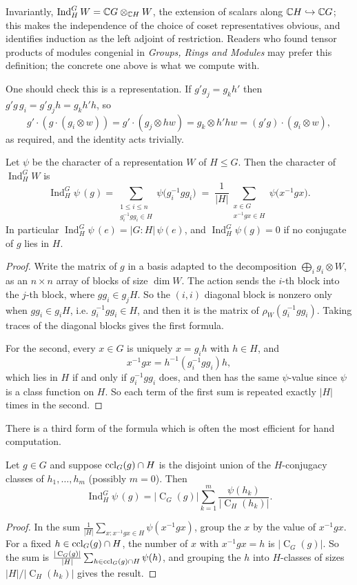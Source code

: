 \documentclass[a4paper]{scrartcl}
\newcommand{\Ind}{\operatorname{Ind}}
\newcommand{\Cent}{\operatorname{C}}
\begin{document}
\begin{remark}
	Invariantly, $\Ind_H^GW = \C G\otimes_{\C H}W$, the extension of scalars along $\mathbb{C} H\hookrightarrow\mathbb{C} G$; this makes the independence of the choice of coset representatives obvious, and identifies induction as the left adjoint of restriction. Readers who found tensor products of modules congenial in \emph{Groups, Rings and Modules} may prefer this definition; the concrete one above is what we compute with.
\end{remark}

One should check this is a representation. If $g' g_j = g_k h'$ then $g'g\,g_i = g'g_jh = g_kh'h$, so
$$g'\cdot(g\cdot(g_i\otimes w)) = g'\cdot (g_j\otimes hw) = g_k\otimes h'hw = (g'g)\cdot(g_i\otimes w),$$
as required, and the identity acts trivially.

\begin{theorem}
	Let $\psi$ be the character of a representation $W$ of $H\leq G$. Then the character of $\Ind_H^GW$ is
	$$\Ind_H^G\psi\,(g) = \sum_{\substack{1\leq i\leq n \\ g_i^{-1}gg_i\in H}}\psi\big(g_i^{-1}gg_i\big) \; = \; \frac1{|H|}\sum_{\substack{x\in G\\ x^{-1}gx\in H}}\psi\big(x^{-1}gx\big).$$
	In particular $\Ind_H^G\psi\,(e) = |G:H|\,\psi(e)$, and $\Ind_H^G\psi(g) = 0$ if no conjugate of $g$ lies in $H$.
\end{theorem}
\begin{proof}
	Write the matrix of $g$ in a basis adapted to the decomposition $\bigoplus_i g_i\otimes W$, as an $n\times n$ array of blocks of size $\dim W$. The action sends the $i$-th block into the $j$-th block, where $gg_i \in g_jH$. So the $(i,i)$ diagonal block is nonzero only when $gg_i\in g_iH$, i.e. $g_i^{-1}gg_i\in H$, and then it is the matrix of $\rho_W(g_i^{-1}gg_i)$. Taking traces of the diagonal blocks gives the first formula.

	For the second, every $x\in G$ is uniquely $x = g_ih$ with $h\in H$, and
	$$x^{-1}gx = h^{-1}(g_i^{-1}gg_i)h,$$
	which lies in $H$ if and only if $g_i^{-1}gg_i$ does, and then has the same $\psi$-value since $\psi$ is a class function on $H$. So each term of the first sum is repeated exactly $|H|$ times in the second.
\end{proof}

There is a third form of the formula which is often the most efficient for hand computation.

\begin{corollary}
	Let $g \in G$ and suppose $\operatorname{ccl}_G(g)\cap H$ is the disjoint union of the $H$-conjugacy classes of $h_1,\dots,h_m$ (possibly $m = 0$). Then
	$$\Ind_H^G\psi\,(g) = |\Cent_G(g)|\sum_{k=1}^m\frac{\psi(h_k)}{|\Cent_H(h_k)|}.$$
\end{corollary}
\begin{proof}
	In the sum $\frac1{|H|}\sum_{x: x^{-1}gx\in H}\psi(x^{-1}gx)$, group the $x$ by the value of $x^{-1}gx$. For a fixed $h\in\operatorname{ccl}_G(g)\cap H$, the number of $x$ with $x^{-1}gx = h$ is $|\Cent_G(g)|$. So the sum is $\frac{|\Cent_G(g)|}{|H|}\sum_{h\in\ccl_G(g)\cap H}\psi(h)$, and grouping the $h$ into $H$-classes of sizes $|H|/|\Cent_H(h_k)|$ gives the result.
\end{proof}
\end{document}
